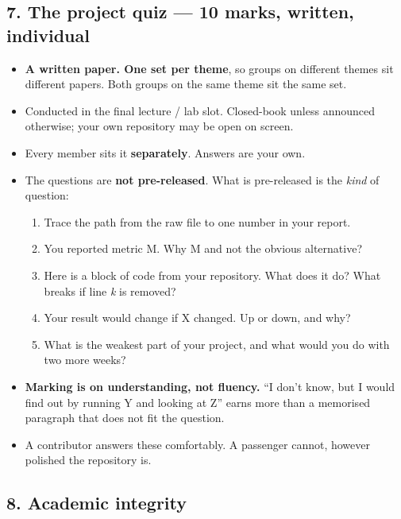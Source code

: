 \documentclass[11pt]{article}
\providecommand{\tightlist}{\setlength{\itemsep}{0pt}\setlength{\parskip}{0pt}}
\begin{document}
\hypertarget{the-project-quiz-10-marks-written-individual}{%
\subsection{7. The project quiz --- 10 marks, written, individual}\label{the-project-quiz-10-marks-written-individual}}

\begin{itemize}
\item
  \textbf{A written paper. One set per theme}, so groups on different themes sit
  different papers. Both groups on the same theme sit the same set.
\item
  Conducted in the final lecture / lab slot. Closed-book unless announced
  otherwise; your own repository may be open on screen.
\item
  Every member sits it \textbf{separately}. Answers are your own.
\item
  The questions are \textbf{not pre-released}. What is pre-released is the \emph{kind} of
  question:

  \begin{enumerate}
  \def\labelenumi{\arabic{enumi}.}
  \tightlist
  \item
    Trace the path from the raw file to one number in your report.
  \item
    You reported metric M. Why M and not the obvious alternative?
  \item
    Here is a block of code from your repository. What does it do? What breaks
    if line \emph{k} is removed?
  \item
    Your result would change if X changed. Up or down, and why?
  \item
    What is the weakest part of your project, and what would you do with two
    more weeks?
  \end{enumerate}
\item
  \textbf{Marking is on understanding, not fluency.} ``I don't know, but I would find
  out by running Y and looking at Z'' earns more than a memorised paragraph that
  does not fit the question.
\item
  A contributor answers these comfortably. A passenger cannot, however polished
  the repository is.
\end{itemize}



\hypertarget{academic-integrity}{%
\subsection{8. Academic integrity}\label{academic-integrity}}
\end{document}
